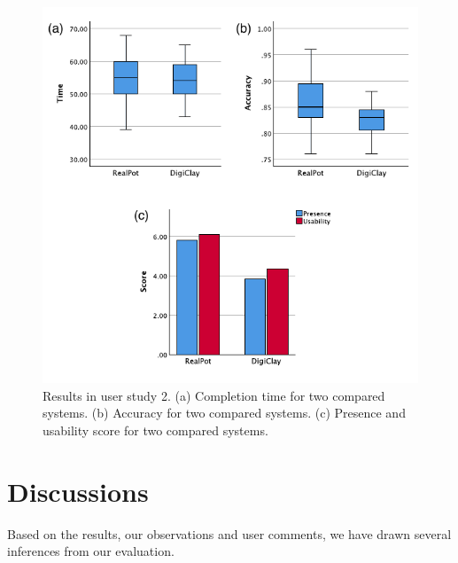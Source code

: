 \documentclass{svjour3}                     %
\begin{document}
{\begin{figure}
	\includegraphics[width=\textwidth]{fig14}
	\caption{Results in user study 2. (a) Completion time for two compared systems. (b) Accuracy for two compared systems. (c) Presence and usability score for two compared systems.}
	\label{fig:r2}
\end{figure}




\section{Discussions}
\label{sec:discussion}

Based on the results, our observations and user comments, we have drawn several inferences from our evaluation.

}
\end{document}
